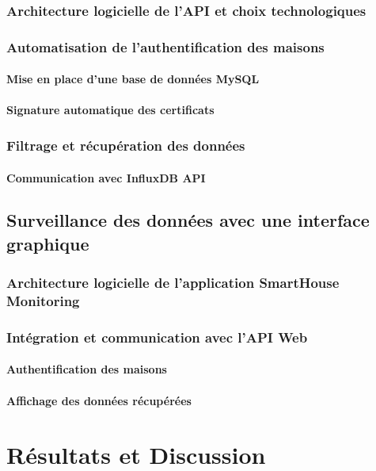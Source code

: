 \documentclass[10pt, a4paper]{report}
\begin{document}
	\subsection{Architecture logicielle de l'API et choix technologiques}
	\subsection{Automatisation de l'authentification des maisons}
	\subsubsection{Mise en place d'une base de données MySQL}
	\subsubsection{Signature automatique des certificats}
	\subsection{Filtrage et récupération des données}
	\subsubsection{Communication avec InfluxDB API}
	
	\section{Surveillance des données avec une interface graphique}
	\subsection{Architecture logicielle de l'application SmartHouse Monitoring}
	\subsection{Intégration et communication avec l'API Web}
	\subsubsection{Authentification des maisons}
	\subsubsection{Affichage des données récupérées}
	
	\chapter{Résultats et Discussion}
\end{document}

